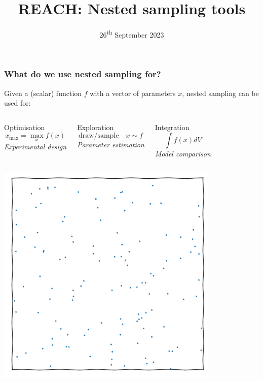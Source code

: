 \documentclass[aspectratio=169]{beamer}
\title{REACH: Nested sampling tools}
\date{26\textsuperscript{th} September 2023}
\begin{document}
\begin{frame}
    \titlepage
\end{frame}

\begin{frame}
    \frametitle{What do we use nested sampling for?}
        Given a (scalar) function $f$ with a vector of parameters $x$, nested sampling can be used for:
    \vspace{-10pt}
    \begin{columns}[t]
        \begin{block}{Optimisation}
            \[x_\text{max} = \max_x{f(x)}\]
            \hfill \emph{Experimental design}
        \end{block}
        \begin{block}{Exploration}
            \vspace{-10pt}
            \[\text{draw/sample}\quad x\sim f\]
            \hfill \emph{Parameter estimation}
        \end{block}
        \begin{block}{Integration}
            \[\int f(x) dV \]
            \hfill \emph{Model comparison}
        \end{block}
    \end{columns}
    \begin{columns}[t]
        \centerline{\includegraphics[width=0.8\textwidth,page=13]{figures/himmelblau}}

\end{columns}
\end{frame}
\end{document}
